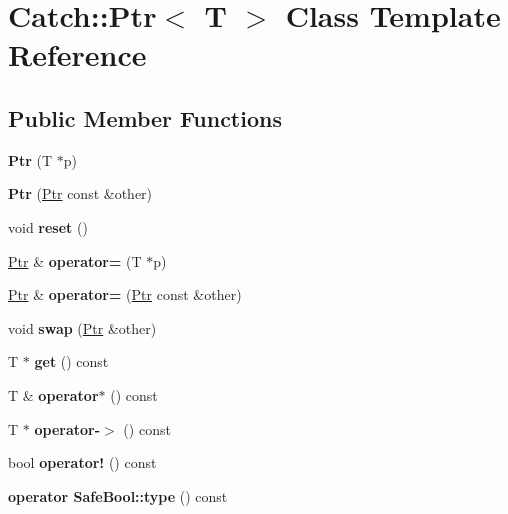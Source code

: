 \hypertarget{class_catch_1_1_ptr}{}\section{Catch\+:\+:Ptr$<$ T $>$ Class Template Reference}
\label{class_catch_1_1_ptr}
\subsection*{Public Member Functions}
\begin{DoxyCompactItemize}
\item 
\mbox{\label{class_catch_1_1_ptr_aacec063a79cd142e39040a31c6b3c40b}} 
{\bfseries Ptr} (T $\ast$p)
\item 
\mbox{\label{class_catch_1_1_ptr_ac629dd8ebe5763a37bb89e6c1d6a1771}} 
{\bfseries Ptr} (\hyperlink{class_catch_1_1_ptr}{Ptr} const \&other)
\item 
\mbox{\label{class_catch_1_1_ptr_af8d0fa7a2cd20842830b354ac31dfe5c}} 
void {\bfseries reset} ()
\item 
\mbox{\label{class_catch_1_1_ptr_a9b08c868b447d679ed201921f5c94683}} 
\hyperlink{class_catch_1_1_ptr}{Ptr} \& {\bfseries operator=} (T $\ast$p)
\item 
\mbox{\label{class_catch_1_1_ptr_af42074444c1bc6a70ebdc406a8617708}} 
\hyperlink{class_catch_1_1_ptr}{Ptr} \& {\bfseries operator=} (\hyperlink{class_catch_1_1_ptr}{Ptr} const \&other)
\item 
\mbox{\label{class_catch_1_1_ptr_a172bf8b4e71e26a5a4d92f5b02158b50}} 
void {\bfseries swap} (\hyperlink{class_catch_1_1_ptr}{Ptr} \&other)
\item 
\mbox{\label{class_catch_1_1_ptr_a2158bb2a1a21b001a2e72d4591d3e31e}} 
T $\ast$ {\bfseries get} () const
\item 
\mbox{\label{class_catch_1_1_ptr_a8d73989b1c77a1cab6152766feaa837f}} 
T \& {\bfseries operator$\ast$} () const
\item 
\mbox{\label{class_catch_1_1_ptr_acc0996cbd99f360069260a898b3f4fda}} 
T $\ast$ {\bfseries operator-\/$>$} () const
\item 
\mbox{\label{class_catch_1_1_ptr_a85c4fe6cebf2a69d0416020b65714360}} 
bool {\bfseries operator!} () const
\item 
\mbox{\label{class_catch_1_1_ptr_a102838cb25643586679e12efca26a3af}} 
{\bfseries operator Safe\+Bool\+::type} () const
\end{DoxyCompactItemize}


